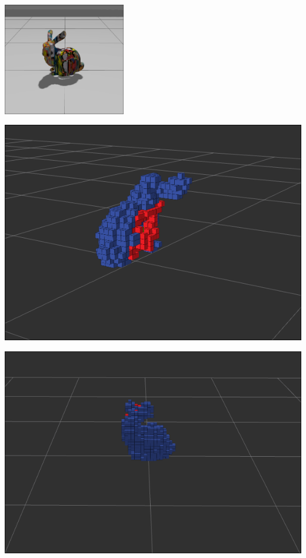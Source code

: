 \documentclass{beamer}
\begin{document}
\begin{frame}
	\centering
	\includegraphics[width=0.4\textwidth]{Graphics/bunny.png}

	\begin{minipage}{0.49\textwidth}
		\centering
		\includegraphics[width=\textwidth]{Graphics/voxel_side.png}
	\end{minipage}
	\hfill
	\begin{minipage}{0.49\textwidth}
		\includegraphics[width=\textwidth]{Graphics/voxel_front.png}
	\end{minipage}

\end{frame}
\end{document}
